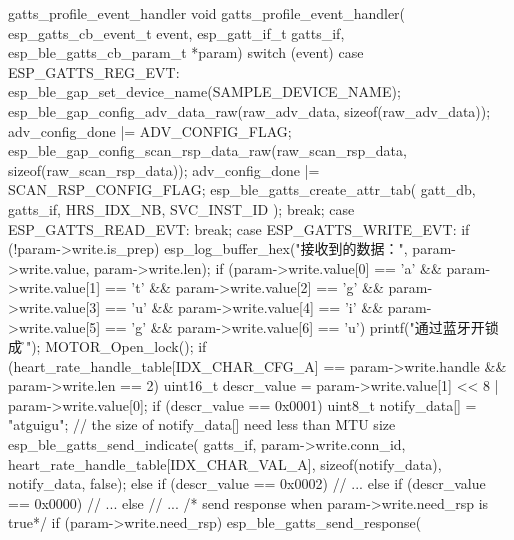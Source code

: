 \documentclass[lang=cn,newtx,10pt,scheme=chinese]{elegantbook}
\begin{document}
\begin{mycode}{gatts\_profile\_event\_handler}
void gatts_profile_event_handler(
    esp_gatts_cb_event_t event,
    esp_gatt_if_t gatts_if,
    esp_ble_gatts_cb_param_t *param)
{
    switch (event)
    {
    case ESP_GATTS_REG_EVT:
    {
        esp_ble_gap_set_device_name(SAMPLE_DEVICE_NAME);
        esp_ble_gap_config_adv_data_raw(raw_adv_data, sizeof(raw_adv_data));
        adv_config_done |= ADV_CONFIG_FLAG;
        esp_ble_gap_config_scan_rsp_data_raw(raw_scan_rsp_data, sizeof(raw_scan_rsp_data));
        adv_config_done |= SCAN_RSP_CONFIG_FLAG;
        esp_ble_gatts_create_attr_tab(
            gatt_db,
            gatts_if,
            HRS_IDX_NB,
            SVC_INST_ID
        );
    }
    break;
    case ESP_GATTS_READ_EVT:
        break;
    case ESP_GATTS_WRITE_EVT:
        if (!param->write.is_prep)
        {
            esp_log_buffer_hex("接收到的数据：", param->write.value, param->write.len);
            if (param->write.value[0] == 'a'
               && param->write.value[1] == 't'
               && param->write.value[2] == 'g'
               && param->write.value[3] == 'u'
               && param->write.value[4] == 'i'
               && param->write.value[5] == 'g'
               && param->write.value[6] == 'u')
            {
                printf("通过蓝牙开锁成功\r\n");
                MOTOR_Open_lock();
            }
            if (heart_rate_handle_table[IDX_CHAR_CFG_A] == param->write.handle
                && param->write.len == 2)
            {
                uint16_t descr_value = param->write.value[1] << 8 | param->write.value[0];
                if (descr_value == 0x0001)
                {
                    uint8_t notify_data[] = "atguigu";
                    // the size of notify_data[] need less than MTU size
                    esp_ble_gatts_send_indicate(
                        gatts_if,
                        param->write.conn_id,
                        heart_rate_handle_table[IDX_CHAR_VAL_A],
                        sizeof(notify_data),
                        notify_data,
                        false);
                }
                else if (descr_value == 0x0002)
                {
                    // ...
                }
                else if (descr_value == 0x0000)
                {
                    // ...
                }
                else
                {
                    // ...
                }
            }
            /* send response when param->write.need_rsp is true*/
            if (param->write.need_rsp)
            {
                esp_ble_gatts_send_response(
}}}}
\end{mycode}
\end{document}
